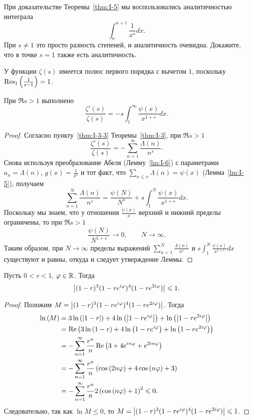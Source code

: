 \begin{nproblem}
\label{prb:I-1}
    При доказательстве Теоремы~\ref{thm:I-5} мы воспользовались аналитичностью интеграла
    \[
        \int_{n}^{n+1} \frac{1}{x^{s}}dx.
    \]
    При $s \ne 1$ это просто разность степеней, и аналитичность очевидна. Докажите, что в точке $s = 1$ также есть аналитичность.
\end{nproblem}

\begin{ncorollary}
\label{crl:I-6}
    У функции $\zeta(s)$ имеется полюс первого порядка с вычетом $1$, поскольку $\operatorname*{Res}_{1}\left(\frac{1}{s-1}\right) = 1$.
\end{ncorollary}

\begin{nlemma}
\label{lm:I-7}
    При $\Re{s} > 1$ выполнено
    \[
        \frac{\zeta'(s)}{\zeta(s)} = -s \int_{1}^{\infty} \frac{\psi(x)}{x^{1 + s}}dx.
    \]
\end{nlemma}
\begin{proof}
    Согласно пункту~\ref{thm:I-3-3} Теоремы~\ref{thm:I-3}, при $\Re{s} > 1$
    \[
        \frac{\zeta'(s)}{\zeta(s)} = -\sum_{n=1}^{\infty} \frac{\Lambda(n)}{n^s}.
    \]
    Снова используя преобразование Абеля (Лемму~\ref{lm:I-6}) с параметрами $a_n = \Lambda(n)$, $g(x) = \frac{1}{x^s}$ и тот факт, что $\sum_{n \le x} \Lambda(n) = \psi(x)$ (Лемма~\ref{lm:I-5}), получаем
    \[
        \sum_{n=1}^{N} \frac{\Lambda(n)}{n^s} 
        = \frac{\psi(N)}{N^s} + s\int_{1}^{N}\frac{\psi(x)}{x^{1+s}}dx.
    \]
    Поскольку мы знаем, что у отношения $\frac{\psi(x)}{x}$ верхний и нижний пределы ограничены, то при $\Re{s} > 1$ 
    \[
        \frac{\psi(N)}{N^{1 + s}} \to 0, \qquad N \to \infty.
    \]
    Таким образом, при $N \to \infty$ пределы выражений $\sum_{n=1}^{N} \frac{\Lambda(n)}{n^s}$ и $s\int_{1}^{N} \frac{\psi(x)}{x^{1+s}}dx$ существуют и равны, откуда и следует утверждение Леммы.
\end{proof}

\begin{nlemma}
\label{lm:I-8}
    Пусть $0 < r < 1$, $\varphi \in \mathbb{R}$. Тогда
    \[
        \left| (1 - r)^3 (1 - re^{i\varphi})^4 (1 - re^{2i\varphi}) \right| \leqslant 1.
    \]
\end{nlemma}
\begin{proof}
    Положим $M = \left| (1 - r)^3 (1 - re^{i\varphi})^4 (1 - re^{2i\varphi}) \right|$. Тогда
    \begin{align*}
        \operatorname{ln}\left( M \right) &= 3\operatorname{ln}\left( \left| 1 - r \right| \right) + 4\operatorname{ln}\left( \left| 1 - re^{i\varphi} \right| \right) + \operatorname{ln}\left( \left| 1 - re^{2i\varphi} \right| \right) \\
        &= \operatorname{Re}\left( 3\operatorname{ln}\left( 1 - r \right) + 4\operatorname{ln}\left( 1 - re^{i\varphi} \right) + \operatorname{ln}\left( 1 - re^{2i\varphi} \right) \right) \\
        &= -\sum_{n=1}^{\infty} \frac{r^n}{n}\operatorname{Re}\left( 3 + 4e^{in\varphi} + e^{2in\varphi} \right) \\
        &= -\sum_{n=1}^{\infty} \frac{r^n}{n} \left(\operatorname{cos}\left( 2n\varphi \right) + 4\operatorname{cos}\left( n\varphi \right) + 3\right) \\
        &= -\sum_{n=1}^{\infty} \frac{r^n}{n} 2\left(\operatorname{cos}\left( n\varphi \right) + 1\right)^2 \leqslant 0.
    \end{align*}
    Следовательно, так как $\ln{M} \le 0$, то $M = \left| (1 - r)^3 (1 - re^{i\varphi})^4 (1 - re^{2i\varphi}) \right| \leqslant 1$.
\end{proof}

